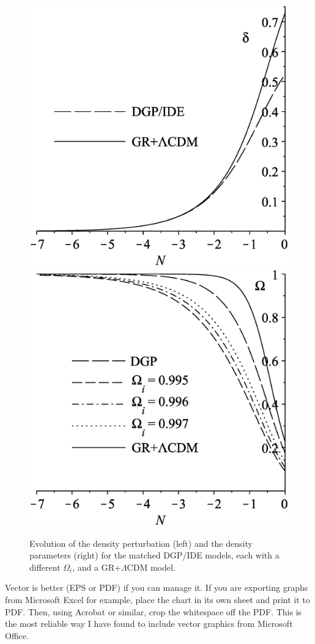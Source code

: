 \begin{figure}
\includegraphics[width=0.49\columnwidth]{figures/dgpdeltas.eps}
\includegraphics[width=0.49\columnwidth]{figures/dgpomegas.eps}
\caption[Evolutions of $\delta$ and $\Omega$ for DGP]{Evolution of the density perturbation (left) and the density parameters (right) for the matched DGP/IDE models, each with a different $\Omega_i$,
and a GR+$\Lambda$CDM model.
\label{fig:matched}}
\end{figure}

Vector is better (EPS or PDF) if you can manage it. If you are exporting graphs from Microsoft Excel for example, place the chart in its own sheet and print it to PDF. Then, using Acrobat or similar, crop the whitespace off the PDF. This is the most reliable way I have found to include vector graphics from Microsoft Office.